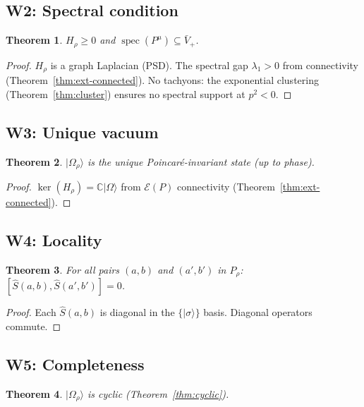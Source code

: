 \documentclass[11pt]{article}
\newtheorem{theorem}{Theorem}[section]
\DeclareMathOperator{\spec}{spec}
\begin{document}
\subsection{W2: Spectral condition}

\begin{theorem}
$H_\rho \ge 0$ and $\spec(P^\mu) \subseteq \bar{V}_+$.
\end{theorem}

\begin{proof}
$H_\rho$ is a graph Laplacian (PSD).  The spectral gap
$\lambda_1 > 0$ from connectivity
(Theorem~\ref{thm:ext-connected}).  No tachyons:
the exponential clustering (Theorem~\ref{thm:cluster})
ensures no spectral support at $p^2 < 0$.
\end{proof}

\subsection{W3: Unique vacuum}
\label{sec:w2}

\begin{theorem}
$|\Omega_\rho\rangle$ is the unique Poincar\'e-invariant
state (up to phase).
\end{theorem}

\begin{proof}
$\ker(H_\rho) = \mathbb{C}|\Omega\rangle$ from
$\mathcal{E}(P)$ connectivity
(Theorem~\ref{thm:ext-connected}).
\end{proof}

\subsection{W4: Locality}
\label{sec:w3}

\begin{theorem}
For all pairs $(a,b)$ and $(a',b')$ in $P_\rho$:
$[\hat{S}(a,b), \hat{S}(a',b')] = 0$.
\end{theorem}

\begin{proof}
Each $\hat{S}(a,b)$ is diagonal in the $\{|\sigma\rangle\}$
basis.  Diagonal operators commute.
\end{proof}

\subsection{W5: Completeness}

\begin{theorem}
$|\Omega_\rho\rangle$ is cyclic
(Theorem~\ref{thm:cyclic}).
\end{theorem}
\end{document}
